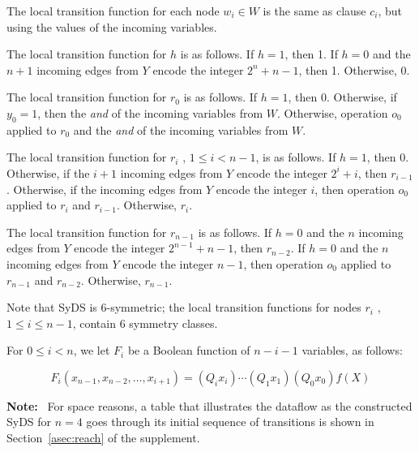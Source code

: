 The local transition function for each node $w_i \in W$ is the same as clause $c_i$,
but using the values of the incoming variables.

The local transition function for $h$ is as follows.
If $h=1$, then 1.
If $h =0$ and  the $n+1$ incoming edges from $Y$ encode the integer $2^n+n-1$, then 1.
Otherwise, $0$.

The local transition function for $r_0$ is as follows.
If $h =1$, then 0.
Otherwise, if $y_0 = 1$, then the {\em and} of the incoming variables from $W$.
Otherwise, operation $o_0$ 
applied to $r_0$ and the {\em and} of the incoming variables from $W$.

The local transition function for $r_i$ , $1 \leq i < n-1$, is as follows.
If $h =1$, then 0.
Otherwise, if the $i+1$ incoming edges from $Y$ encode the integer $2^i+i$, 
then $r_{i-1}$.
Otherwise,  if the incoming edges from $Y$ encode the integer $i$, 
then operation $o_0$ applied to $r_i$ and $r_{i-1}$.
Otherwise, $r_i$.

The local transition function for $r_{n-1}$ is as follows.
If $h=0$ and the $n$ incoming edges from $Y$ encode the integer $2^{n-1}+n-1$, 
then $r_{n-2}$.
If $h =0$ and  the $n$ incoming edges from $Y$ encode the integer $n-1$, 
then operation $o_0$ applied to $r_{n-1}$ and $r_{n-2}$.
Otherwise, $r_{n-1}$.

Note that SyDS \cals{} is 6-symmetric; the local transition functions
for nodes $r_i$ , $1 \leq i \leq n-1$, contain 6 symmetry classes.

For $0 \leq i < n$, we let $F_i$ be a Boolean function of $n-i-1$ variables, 
as follows:

\smallskip
\noindent
$$F_i(x_{n-1}, x_{n-2}, \ldots , x_{i+1}) = (Q_ i x_i) 
\cdots (Q_1 x_1) (Q_0 x_0) f(X)$$

\smallskip

\noindent
\textbf{Note:}~
For space reasons,
a table that illustrates the dataflow as the constructed SyDS \cals{}  
for $n =4$ goes through its initial sequence of transitions is shown
in Section~\ref{asec:reach} of the supplement.

\iffalse


